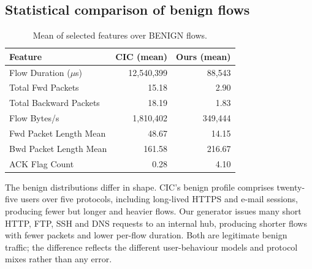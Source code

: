 \documentclass[11pt]{article}
\begin{document}
\subsection{Statistical comparison of benign flows}
\begin{table}[h]
\centering
\caption{Mean of selected features over BENIGN flows.}
\label{tab:benignstats}
\begin{tabular}{@{}lrr@{}}
\toprule
Feature & CIC (mean) & Ours (mean) \\
\midrule
Flow Duration ($\mu$s)   & 12{,}540{,}399 & 88{,}543 \\
Total Fwd Packets        & 15.18 & 2.90 \\
Total Backward Packets   & 18.19 & 1.83 \\
Flow Bytes/s             & 1{,}810{,}402 & 349{,}444 \\
Fwd Packet Length Mean   & 48.67 & 14.15 \\
Bwd Packet Length Mean   & 161.58 & 216.67 \\
ACK Flag Count           & 0.28 & 4.10 \\
\bottomrule
\end{tabular}
\end{table}
The benign distributions differ in shape. CIC's benign profile comprises
twenty-five users over five protocols, including long-lived HTTPS and e-mail
sessions, producing fewer but longer and heavier flows. Our generator issues
many short HTTP, FTP, SSH and DNS requests to an internal hub, producing shorter
flows with fewer packets and lower per-flow duration. Both are legitimate benign
traffic; the difference reflects the different user-behaviour models and protocol
mixes rather than any error.
\end{document}
